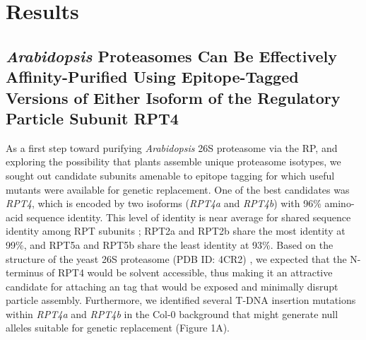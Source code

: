 \section{Results}

\subsection{\textit{Arabidopsis} Proteasomes Can Be Effectively Affinity-Purified Using Epitope-Tagged Versions of Either Isoform of the Regulatory Particle Subunit RPT4}

As a first step toward purifying \textit{Arabidopsis} 26S proteasome via the RP, and exploring the possibility that plants assemble unique proteasome isotypes, we sought out candidate subunits amenable to epitope tagging for which useful mutants were available for genetic replacement.  One of the best candidates was \textit{RPT4}, which is encoded by two isoforms (\textit{RPT4a} and \textit{RPT4b}) with 96\% amino-acid sequence identity.  This level of identity is near average for shared sequence identity among RPT subunits \citep{book10}; RPT2a and RPT2b share the most identity at 99\%, and RPT5a and RPT5b share the least identity at 93\%. Based on the structure of the yeast 26S proteasome (PDB ID: 4CR2) \citep{beck12}, we expected that the N-terminus of RPT4 would be solvent accessible, thus making it an attractive candidate for attaching an tag that would be exposed and minimally disrupt particle assembly.  Furthermore, we identified several T-DNA insertion mutations within \textit{RPT4a} and \textit{RPT4b} in the Col-0 background that might generate null alleles suitable for genetic replacement (Figure 1A).

